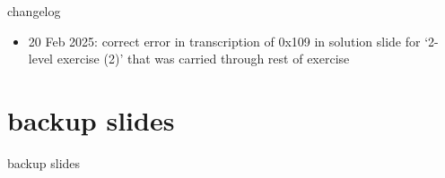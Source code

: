 \date{}
\title{}
\date{}

\begin{frame}
    \titlepage
\end{frame}



{\changelogmode
\begin{frame}{changelog}
\begin{itemize}
\item 20 Feb 2025: correct error in transcription of 0x109 in solution slide for `2-level exercise (2)' that
was carried through rest of exercise
\end{itemize}
\end{frame}
}



\section{backup slides}
\begin{frame}{backup slides}
\end{frame}




